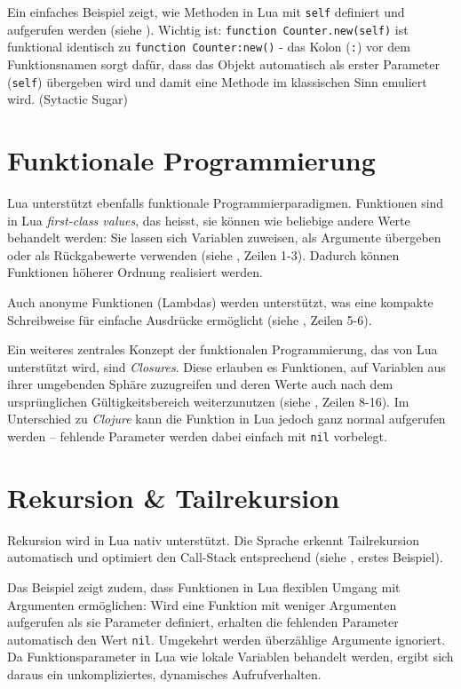 \documentclass[11pt,a4paper]{article}
\begin{document}
Ein einfaches Beispiel zeigt, wie Methoden in Lua mit \texttt{self} definiert und aufgerufen werden (siehe ).
Wichtig ist: \colorbox{codegray}{\lstinline|function Counter.new(self)|} ist funktional identisch zu \colorbox{codegray}{\lstinline|function Counter:new()|} -
das Kolon (\texttt{:}) vor dem Funktionsnamen sorgt dafür, dass das Objekt automatisch als erster Parameter (\texttt{self})
übergeben wird und damit eine Methode im klassischen Sinn emuliert wird. (Sytactic Sugar)

\section*{Funktionale Programmierung}

Lua unterstützt ebenfalls funktionale Programmierparadigmen. Funktionen sind in Lua \textit{first-class values}, das heisst,
sie können wie beliebige andere Werte behandelt werden: Sie lassen sich Variablen zuweisen, als Argumente übergeben
oder als Rückgabewerte verwenden (siehe , Zeilen 1-3). Dadurch können Funktionen höherer Ordnung realisiert werden.

Auch anonyme Funktionen (Lambdas) werden unterstützt, was eine kompakte Schreibweise für einfache Ausdrücke ermöglicht (siehe , Zeilen 5-6).

Ein weiteres zentrales Konzept der funktionalen Programmierung, das von Lua unterstützt wird, sind \textit{Closures}.
Diese erlauben es Funktionen, auf Variablen aus ihrer umgebenden Sphäre zuzugreifen und deren Werte auch nach dem ursprünglichen Gültigkeitsbereich weiterzunutzen (siehe , Zeilen 8-16).
Im Unterschied zu \textit{Clojure} kann die Funktion in Lua jedoch ganz normal aufgerufen werden – fehlende Parameter werden dabei einfach mit \texttt{nil} vorbelegt.

\section*{Rekursion \& Tailrekursion}

Rekursion wird in Lua nativ unterstützt. Die Sprache erkennt Tailrekursion automatisch und optimiert den Call-Stack entsprechend (siehe , erstes Beispiel).

Das Beispiel zeigt zudem, dass Funktionen in Lua flexiblen Umgang mit Argumenten ermöglichen:
Wird eine Funktion mit weniger Argumenten aufgerufen als sie Parameter definiert, erhalten die fehlenden Parameter automatisch den Wert \texttt{nil}.
Umgekehrt werden überzählige Argumente ignoriert.
Da Funktionsparameter in Lua wie lokale Variablen behandelt werden, ergibt sich daraus ein unkompliziertes, dynamisches Aufrufverhalten.
\end{document}
